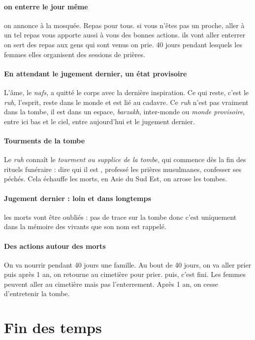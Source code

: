 \paragraph{on enterre le jour même}
on annonce à la mosquée. Repas pour tous. si vous n'êtes pas un proche, aller à un tel repas vous apporte aussi à vous des bonnes actions. ils vont aller enterrer on sert des repas aux gens qui sont venus on prie. 40 jours pendant lesquels les femmes elles organisent des sessions de prières.
\paragraph{En attendant le jugement dernier, un état provisoire} L'âme, le \textit{nafs,} a quitté le corps avec la dernière inspiration. Ce qui reste, c'est le \textit{ruh}, l'esprit, reste dans le monde et est lié au cadavre. Ce \textit{ruh} n'est pas vraiment dans la tombe, il est dans un espace, \textit{barzakh}, inter-monde ou \textit{monde provisoire}, entre ici bas et le ciel, entre aujourd'hui et le jugement dernier. 

\paragraph{Tourments de la tombe} Le \textit{ruh} connaît le \textit{tourment ou supplice de la tombe}, qui commence dès la fin des rituels funéraire : dire qui il est , professé les prières musulmanes, confesser ses péchés. Cela échauffe les morts, en Asie du Sud Est, on arrose les tombes.


\paragraph{Jugement dernier : loin et dans longtemps} les morts vont être oubliés : pas de trace sur la tombe donc c'est uniquement dans la mémoire des vivants que son nom est rappelé. 

\paragraph{Des actions autour des morts} On va nourrir pendant 40 jours  une famille. Au bout de 40 jours, on va aller prier puis après 1 an, on retourne au cimetière pour prier. puis, c'est fini. 
Les femmes peuvent aller au cimetière mais pas l'enterrement. 
Après 1 an, on cesse d'entretenir la tombe.


\section{Fin des temps}


